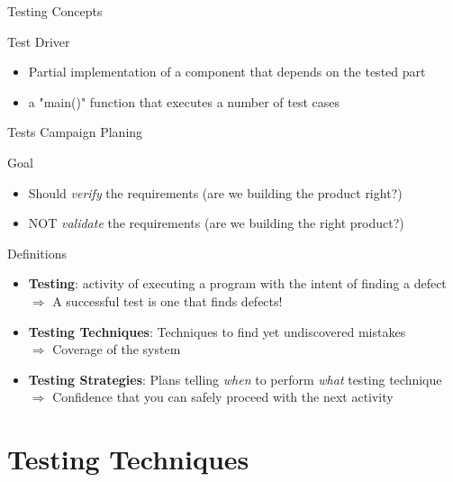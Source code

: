 \begin{frame}[squeeze]{Testing Concepts}
  \begin{block}{Test Driver}
    \begin{itemize}\vspace{-.4\baselineskip}
    \item Partial implementation of a component that depends on the tested
      part
    \item a "main()" function that executes a number of test cases
    \end{itemize}         
  \end{block}
\end{frame}
\begin{frame}{Tests Campaign Planing}
  \begin{block}{Goal}
    \begin{itemize}
    \item Should \textit{verify} the requirements (are we building the product right?)
    \item NOT \textit{validate} the requirements (are we building the right
      product?)
    \end{itemize}
  \end{block}

  \begin{block}{Definitions}
    \begin{itemize}
    \item \alert{\bf Testing}: activity of executing a program with the intent
      of finding a defect\\
      $\Rightarrow$ A successful test is one that finds defects!
    \item \alert{\bf Testing Techniques}:
     Techniques to find yet undiscovered mistakes\\
     $\Rightarrow$  Coverage of the system
   \item \alert{\bf Testing Strategies}:
    Plans telling \textit{when} to perform \textit{what} testing technique\\
    $\Rightarrow$  Confidence that you can safely proceed with the next activity

    \end{itemize}
  \end{block}
\end{frame}
\section{Testing Techniques}\sectionpage
